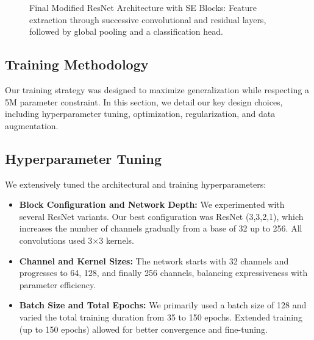 \documentclass[letterpaper]{article}
\begin{document}
\begin{figure}[ht]
{
}
\caption{Final Modified ResNet Architecture with SE Blocks: Feature extraction through successive convolutional and residual layers, followed by global pooling and a classification head.}
\label{fig:resnet_architecture}
\end{figure}

\subsection{Training Methodology}

Our training strategy was designed to maximize generalization while respecting a 5M parameter constraint. In this section, we detail our key design choices, including hyperparameter tuning, optimization, regularization, and data augmentation.

\subsection{Hyperparameter Tuning}
We extensively tuned the architectural and training hyperparameters:
\begin{itemize}
    \item \textbf{Block Configuration and Network Depth:} We experimented with several ResNet variants. Our best configuration was ResNet (3,3,2,1), which increases the number of channels gradually from a base of 32 up to 256. All convolutions used 3$\times$3 kernels.
    \item \textbf{Channel and Kernel Sizes:} The network starts with 32 channels and progresses to 64, 128, and finally 256 channels, balancing expressiveness with parameter efficiency.
    \item \textbf{Batch Size and Total Epochs:} We primarily used a batch size of 128 and varied the total training duration from 35 to 150 epochs. Extended training (up to 150 epochs) allowed for better convergence and fine-tuning.
\end{itemize}
\end{document}
